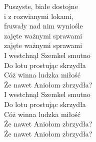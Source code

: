 \begin{text}
Puszyste, białe dostojne\\
i z rozwianymi lokami,\\
fruwały nad nim wyniośle\\
zajęte ważnymi sprawami\\
zajęte ważnymi sprawami\\

\vin I westchnął Szemkel smutno\\
\vin Do lotu prostując skrzydła\\
\vin Cóż winna ludzka miłość\\
\vin Że nawet Aniołom zbrzydła?\\

\vin I westchnął Szemkel smutno\\
\vin Do lotu prostując skrzydła\\
\vin Cóż winna ludzka miłość\\
\vin Że nawet Aniołom zbrzydła?\\
\vin Że nawet Aniołom zbrzydła?\\
\vin \\
\end{text}
